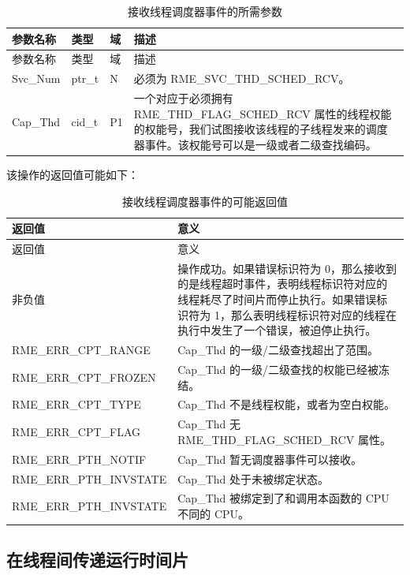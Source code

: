\begin{xltabular}{\textwidth}{@{}>{\hsize\raggedright\arraybackslash}X>{\hsize\raggedright\arraybackslash}X>{\hsize\raggedright\arraybackslash}X>{\hsize\raggedright\arraybackslash}X@{}}
\caption{接收线程调度器事件的所需参数}\label{tab:4-32-receive-thread-scheduler-event-parameters}\\
\toprule
参数名称 & 类型 & 域 & 描述\tabularnewline
\endfirsthead
\toprule
参数名称 & 类型 & 域 & 描述\tabularnewline
\midrule
\endhead
\bottomrule
\endlastfoot
Svc\_Num & ptr\_t & N & 必须为 RME\_SVC\_THD\_SCHED\_RCV。\tabularnewline
Cap\_Thd & cid\_t & P1 &
一个对应于必须拥有 RME\_THD\_FLAG\_SCHED\_RCV 属性的线程权能的权能号，我们试图接收该线程的子线程发来的调度器事件。该权能号可以是一级或者二级查找编码。\tabularnewline
\end{xltabular}

该操作的返回值可能如下：

\begin{xltabular}{\textwidth}{@{}>{\hsize\raggedright\arraybackslash}X>{\hsize\raggedright\arraybackslash}X@{}}
\caption{接收线程调度器事件的可能返回值}\label{tab:4-33-receive-thread-scheduler-event-return-values}\\
\toprule
返回值 & 意义\tabularnewline
\endfirsthead
\toprule
返回值 & 意义\tabularnewline
\midrule
\endhead
\bottomrule
\endlastfoot
    非负值 & 操作成功。如果错误标识符为 0，那么接收到的是线程超时事件，表明线程标识符对应的线程耗尽了时间片而停止执行。如果错误标识符为 1，那么表明线程标识符对应的线程在执行中发生了一个错误，被迫停止执行。\tabularnewline
    RME\_ERR\_CPT\_RANGE & Cap\_Thd 的一级/二级查找超出了范围。\tabularnewline
    RME\_ERR\_CPT\_FROZEN & Cap\_Thd 的一级/二级查找的权能已经被冻结。\tabularnewline
    RME\_ERR\_CPT\_TYPE & Cap\_Thd 不是线程权能，或者为空白权能。\tabularnewline
    RME\_ERR\_CPT\_FLAG & Cap\_Thd 无 RME\_THD\_FLAG\_SCHED\_RCV 属性。\tabularnewline
    RME\_ERR\_PTH\_NOTIF & Cap\_Thd 暂无调度器事件可以接收。\tabularnewline
    RME\_ERR\_PTH\_INVSTATE & Cap\_Thd 处于未被绑定状态。\tabularnewline
    RME\_ERR\_PTH\_INVSTATE & Cap\_Thd 被绑定到了和调用本函数的 CPU 不同的 CPU。\tabularnewline
\end{xltabular}

\subsection{在线程间传递运行时间片}\label{subsec:4-transfer-run-time-slice-between-threads}

